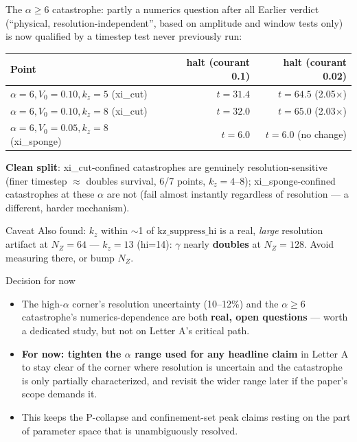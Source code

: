 \documentclass[aspectratio=169,11pt]{beamer}
\newenvironment{caveat}{\begin{alertblock}{Caveat}}{\end{alertblock}}
\newcommand{\Vo}{V_0}
\newcommand{\kz}{k_z}
\begin{document}
\begin{frame}{The $\alpha\ge6$ catastrophe: partly a numerics question after all}
Earlier verdict (``physical, resolution-independent'', based on amplitude and
window tests only) is now qualified by a timestep test never previously run:
\footnotesize
\begin{tabular}{lrr}
Point & halt (courant 0.1) & halt (courant 0.02)\\\midrule
$\alpha=6,\Vo=0.10,\kz=5$ (xi\_cut) & $t=31.4$ & $t=64.5$ (2.05$\times$)\\
$\alpha=6,\Vo=0.10,\kz=8$ (xi\_cut) & $t=32.0$ & $t=65.0$ (2.03$\times$)\\
$\alpha=6,\Vo=0.05,\kz=8$ (xi\_sponge) & $t=6.0$ & $t=6.0$ (no change)\\
\end{tabular}
\normalsize
\vspace{0.1em}
\textbf{Clean split}: xi\_cut-confined catastrophes are genuinely
resolution-sensitive (finer timestep $\approx$ doubles survival, 6/7 points, $\kz=4$--8);
xi\_sponge-confined catastrophes at these $\alpha$ are not (fail almost instantly
regardless of resolution — a different, harder mechanism).
\begin{caveat}
Also found: $\kz$ within $\sim$1 of $\text{kz\_suppress\_hi}$ is a real,
\emph{large} resolution artifact at $N_Z=64$ — $\kz=13$ (hi=14): $\gamma$ nearly
\textbf{doubles} at $N_Z=128$. Avoid measuring there, or bump $N_Z$.
\end{caveat}
\end{frame}

\begin{frame}{Decision for now}
\begin{itemize}
\item The high-$\alpha$ corner's resolution uncertainty (10--12\%) and the
$\alpha\ge6$ catastrophe's numerics-dependence are both \textbf{real, open
questions} — worth a dedicated study, but not on Letter A's critical path.
\item \textbf{For now: tighten the $\alpha$ range used for any headline claim}
in Letter A to stay clear of the corner where resolution is uncertain and the
catastrophe is only partially characterized, and revisit the wider range later
if the paper's scope demands it.
\item This keeps the P-collapse and confinement-set peak claims resting on the
part of parameter space that is unambiguously resolved.
\end{itemize}
\end{frame}
\end{document}
